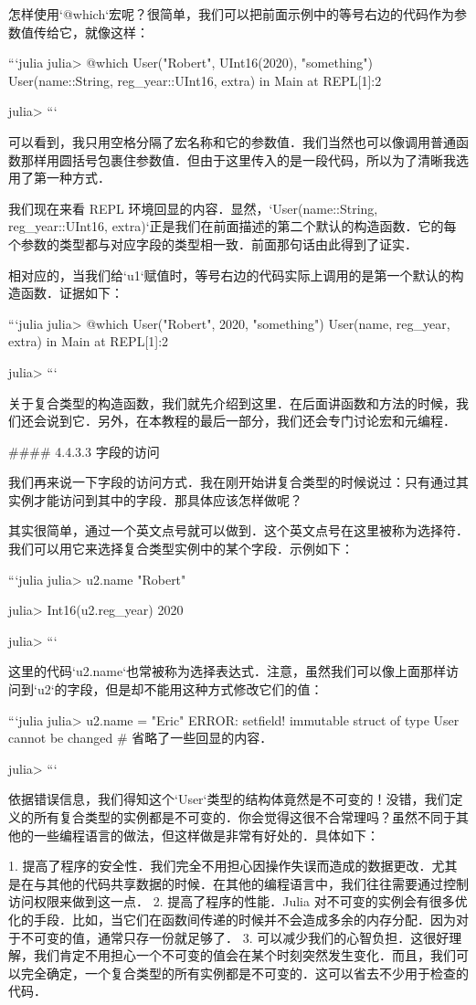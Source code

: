 怎样使用`@which`宏呢？很简单，我们可以把前面示例中的等号右边的代码作为参数值传给它，就像这样：

```julia
julia> @which User("Robert", UInt16(2020), "something")
User(name::String, reg_year::UInt16, extra) in Main at REPL[1]:2

julia> 
```

可以看到，我只用空格分隔了宏名称和它的参数值．我们当然也可以像调用普通函数那样用圆括号包裹住参数值．但由于这里传入的是一段代码，所以为了清晰我选用了第一种方式．

我们现在来看 REPL 环境回显的内容．显然，`User(name::String, reg_year::UInt16, extra)`正是我们在前面描述的第二个默认的构造函数．它的每个参数的类型都与对应字段的类型相一致．前面那句话由此得到了证实．

相对应的，当我们给`u1`赋值时，等号右边的代码实际上调用的是第一个默认的构造函数．证据如下：

```julia 
julia> @which User("Robert", 2020, "something")
User(name, reg_year, extra) in Main at REPL[1]:2

julia> 
```

关于复合类型的构造函数，我们就先介绍到这里．在后面讲函数和方法的时候，我们还会说到它．另外，在本教程的最后一部分，我们还会专门讨论宏和元编程．

#### 4.4.3.3 字段的访问

我们再来说一下字段的访问方式．我在刚开始讲复合类型的时候说过：只有通过其实例才能访问到其中的字段．那具体应该怎样做呢？

其实很简单，通过一个英文点号就可以做到．这个英文点号在这里被称为选择符．我们可以用它来选择复合类型实例中的某个字段．示例如下：

```julia 
julia> u2.name
"Robert"

julia> Int16(u2.reg_year)
2020

julia> 
```

这里的代码`u2.name`也常被称为选择表达式．注意，虽然我们可以像上面那样访问到`u2`的字段，但是却不能用这种方式修改它们的值：

```julia
julia> u2.name = "Eric"
ERROR: setfield! immutable struct of type User cannot be changed
# 省略了一些回显的内容．

julia> 
```

依据错误信息，我们得知这个`User`类型的结构体竟然是不可变的！没错，我们定义的所有复合类型的实例都是不可变的．你会觉得这很不合常理吗？虽然不同于其他的一些编程语言的做法，但这样做是非常有好处的．具体如下：

1. 提高了程序的安全性．我们完全不用担心因操作失误而造成的数据更改．尤其是在与其他的代码共享数据的时候．在其他的编程语言中，我们往往需要通过控制访问权限来做到这一点．
2. 提高了程序的性能．Julia 对不可变的实例会有很多优化的手段．比如，当它们在函数间传递的时候并不会造成多余的内存分配．因为对于不可变的值，通常只存一份就足够了．
3. 可以减少我们的心智负担．这很好理解，我们肯定不用担心一个不可变的值会在某个时刻突然发生变化．而且，我们可以完全确定，一个复合类型的所有实例都是不可变的．这可以省去不少用于检查的代码．

